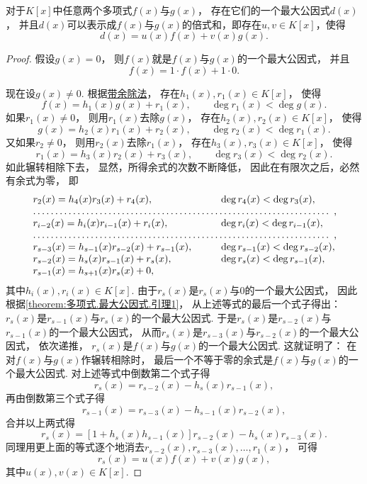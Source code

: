 \begin{theorem}\label{theorem:多项式.辗转相除法}
对于\(K[x]\)中任意两个多项式\(f(x)\)与\(g(x)\)，
存在它们的一个最大公因式\(d(x)\)，
并且\(d(x)\)可以表示成\(f(x)\)与\(g(x)\)的倍式和，即存在\(u,v \in K[x]\)，使得\[
	d(x) = u(x) f(x) + v(x) g(x).
\]
\begin{proof}
假设\(g(x)=0\)，
则\(f(x)\)就是\(f(x)\)与\(g(x)\)的一个最大公因式，
并且\[
	f(x) = 1 \cdot f(x) + 1 \cdot 0.
\]

现在设\(g(x)\neq0\).
根据\hyperref[theorem:多项式.带余除法]{带余除法}，
存在\(h_1(x),r_1(x) \in K[x]\)，
使得\[
	f(x) = h_1(x) g(x) + r_1(x), \qquad
	\deg r_1(x) < \deg g(x).
\]
如果\(r_1(x)\neq0\)，
则用\(r_1(x)\)去除\(g(x)\)，
存在\(h_2(x),r_2(x) \in K[x]\)，
使得\[
	g(x) = h_2(x) r_1(x) + r_2(x), \qquad
	\deg r_2(x) < \deg r_1(x).
\]
又如果\(r_2\neq0\)，
则用\(r_2(x)\)去除\(r_1(x)\)，
存在\(h_3(x),r_3(x) \in K[x]\)，
使得\[
	r_1(x) = h_3(x) r_2(x) + r_3(x), \qquad
	\deg r_3(x) < \deg r_2(x).
\]
如此辗转相除下去，
显然，所得余式的次数不断降低，
因此在有限次之后，必然有余式为零，
即\[\begin{array}{ll}
	r_2(x) = h_4(x) r_3(x) + r_4(x), \qquad
		&\deg r_4(x) < \deg r_3(x), \\
	\hdotsfor{2}, \\
	r_{i-2}(x) = h_i(x) r_{i-1}(x) + r_i(x), \qquad
		&\deg r_i(x) < \deg r_{i-1}(x), \\
	\hdotsfor{2}, \\
	r_{s-3}(x) = h_{s-1}(x) r_{s-2}(x) + r_{s-1}(x), \qquad
		&\deg r_{s-1}(x) < \deg r_{s-2}(x), \\
	r_{s-2}(x) = h_s(x) r_{s-1}(x) + r_s(x), \qquad
		&\deg r_s(x) < \deg r_{s-1}(x), \\
	r_{s-1}(x) = h_{s+1}(x) r_s(x) + 0,
\end{array}\]
其中\(h_i(x),r_i(x) \in K[x]\).
由于\(r_s(x)\)是\(r_s(x)\)与\(0\)的一个最大公因式，
因此根据\cref{theorem:多项式.最大公因式.引理1}，
从上述等式的最后一个式子得出：
\(r_s(x)\)是\(r_{s-1}(x)\)与\(r_s(x)\)的一个最大公因式.
于是\(r_s(x)\)是\(r_{s-2}(x)\)与\(r_{s-1}(x)\)的一个最大公因式，
从而\(r_s(x)\)是\(r_{s-3}(x)\)与\(r_{s-2}(x)\)的一个最大公因式，
依次递推，
\(r_s(x)\)是\(f(x)\)与\(g(x)\)的一个最大公因式.
这就证明了：
在对\(f(x)\)与\(g(x)\)作辗转相除时，
最后一个不等于零的余式是\(f(x)\)与\(g(x)\)的一个最大公因式.
对上述等式中倒数第二个式子得\[
	r_s(x) = r_{s-2}(x) - h_s(x) r_{s-1}(x),
\]
再由倒数第三个式子得\[
	r_{s-1}(x) = r_{s-3}(x) - h_{s-1}(x) r_{s-2}(x),
\]
合并以上两式得\[
	r_s(x) = [1 + h_s(x) h_{s-1}(x)] r_{s-2}(x) - h_s(x) r_{s-3}(x).
\]
同理用更上面的等式逐个地消去\(r_{s-2}(x),r_{s-3}(x),\dotsc,r_1(x)\)，
可得\[
	r_s(x) = u(x) f(x) + v(x) g(x),
\]
其中\(u(x),v(x) \in K[x]\).
\end{proof}
\end{theorem}

